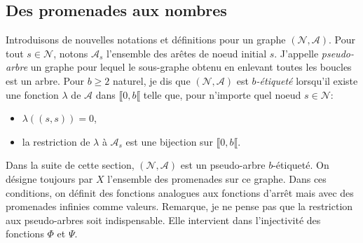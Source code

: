 \subsection{Des promenades aux nombres} \label{SubSec:Prom2Nbs}
Introduisons de nouvelles notations et définitions pour un graphe $(\mathcal{N}, \mathcal{A})$.\newline
Pour tout $s\in \mathcal{N}$, notons $\mathcal{A}_s$ l'ensemble des arêtes de noeud initial $s$.\newline
J'appelle \emph{pseudo-arbre} un graphe pour lequel le sous-graphe obtenu en enlevant toutes les boucles est un arbre.\newline
Pour $b \geq 2$ naturel, je dis que $(\mathcal{N}, \mathcal{A})$ est \emph{$b$-étiqueté} lorsqu'il existe une fonction $\lambda$ de $\mathcal{A}$ dans $\llbracket 0, b \llbracket$ telle que, pour n'importe quel noeud $s\in \mathcal{N}$:
\begin{itemize}
 \item  $\lambda((s,s))=0$,
 \item la restriction de $\lambda$ à $\mathcal{A}_s$ est une bijection sur $\llbracket 0, b \llbracket$.
\end{itemize}
Dans la suite de cette section, $(\mathcal{N}, \mathcal{A})$ est un pseudo-arbre $b$-étiqueté. On désigne toujours par $X$ l'ensemble des promenades sur ce graphe.\newline
Dans ces conditions, on définit des fonctions analogues aux fonctions d'arrêt mais avec des promenades infinies comme valeurs.
\newline
Remarque, je ne pense pas que la restriction aux pseudo-arbres soit indispensable. Elle intervient dans l'injectivité des fonctions $\Phi$ et $\Psi$.

